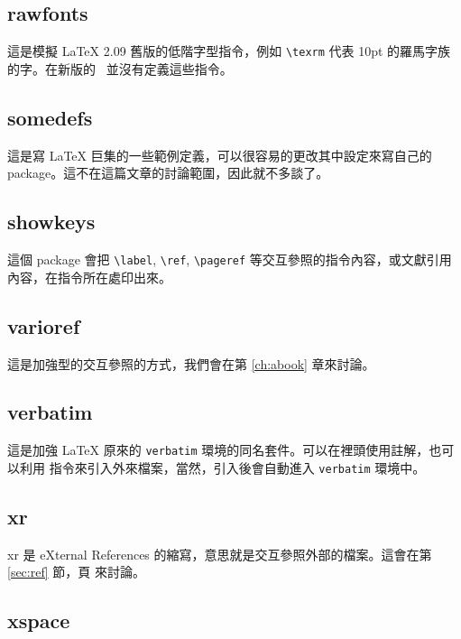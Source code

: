 \subsection{rawfonts}

這是模擬 \LaTeX{} 2.09 舊版的低階字型指令，例如 \verb|\texrm| 代表 10pt 的羅馬字族的字。在新版的 \LaTeXe\ 並沒有定義這些指令。

\subsection{somedefs}

這是寫 \LaTeX{} 巨集的一些範例定義，可以很容易的更改其中設定來寫自己的 package。這不在這篇文章的討論範圍，因此就不多談了。

\subsection{showkeys}

這個 package 會把 \verb|\label|, \verb|\ref|, \verb|\pageref| 等交互參照的指令內容，或文獻引用內容，在指令所在處印出來。

\subsection{varioref}

這是加強型的交互參照的方式，我們會在第 \ref{ch:abook} 章來討論。

\subsection{verbatim}

這是加強 \LaTeX{} 原來的 \texttt{verbatim} 環境的同名套件。可以在裡頭使用註解，也可以利用 \verb|| 指令來引入外來檔案，當然，引入後會自動進入 \texttt{verbatim} 環境中。

\subsection{xr}

\textsf{xr} 是 eXternal References 的縮寫，意思就是交互參照外部的檔案。這會在第 \ref{sec:ref} 節，頁 \pageref{sec:ref} 來討論。

\subsection{xspace}

